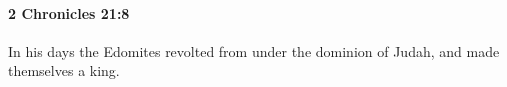 
		\paragraph{2 Chronicles 21:8} %
			\label{2CHRONICLES-21-8}

			In his days the Edomites revolted from under the dominion of Judah, and made themselves a king.


